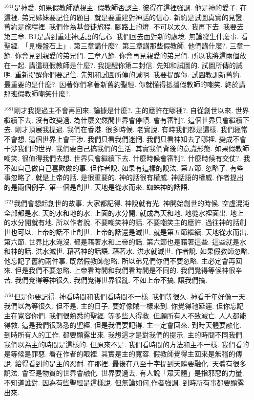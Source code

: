 \documentclass{book}
\begin{document}
$^{1641}$是神愛.
如果假教師藐視主.
假教師否認主.
彼得在這裡強調.
他是神的愛子.
在這裡.
弟兄姊妹要記住的題目.
就是要重建對神話的信心.
新約是試圖真實的見證.
舊約是旅程裡.
我們作為基督徒旅程.
腳路上的燈.
不可以太久.
我再下去.
我要去第三章.
B1是講到重建神話語的信心.
我們回去面對新的處境.
無論發生什麼事.
看聖經.
「見機盤石上」.
第三章講什麼?.
第三章講那些假教師.
他們講什麼?.
三章一節.
你會見到親愛的弟兄們.
三章八節.
你會再見親愛的弟兄們.
所以我將這兩個放在一起.
講這班假教師是什麼?.
我提醒你第二封信.
先知和試圖的.
試圖所傳的誡明.
重新提醒你們要記住.
先知和試圖所傳的誡明.
我要提醒你.
試圖教訓新舊約.
最重要的是什麼?.
因著你們拿著新舊約聖經.
你就懂得抵擋假教師的嘲笑.
終於講那班假教師嘲笑什麼?.

$^{1681}$剛才我提過主不會再回來.
論據是什麼?.
主的應許在哪裡?.
自從創世以來.
世界繼續下去.
沒有改變過.
為什麼突然間世界會停頓.
會有審判?.
這個世界只會繼續下去.
剛才頂展我提過.
我們在香港.
很多時候.
老實說.
有時我們都是這樣.
我們經常不會想.
這個世界上會干涉.
我們只看我們迷惘.
我們只看神知去了哪裡.
變成不會干涉我們的世界.
我們要自己搞我們的生活.
其實我們背後的意識形態.
如果假教師嘲笑.
很值得我們去想.
世界只會繼續下去.
什麼時候會審判?.
什麼時候有交仗?.
我不如自己做自己喜歡做的事.
但作者說.
如果有這樣的說法.
第五節.
忽略了.
有些事忽略了.
就是上帝的話.
是很重要的.
神的話很有權威.
神話語的權威.
作者提出的是兩個例子.
第一個是創世.
天地是從水而來.
蜘蛛神的話語.

$^{1721}$我們會想起創世的故事.
大家都記得.
神說就有光.
神開始創世的時候.
空虛混沌全部都是水.
天的水和地的水.
上面的水分開.
就成為天和地.
地從水裡面出.
地上的水分開就有地.
所以作者說.
不要嘲笑神的話.
不要嘲笑主的應許.
過往神的話創世也可以.
上帝的話不止創世.
上帝的話還是滅世.
就是第五節繼續.
天地從水而出.
第六節.
世界比水淹沒.
都是藉著水和上帝的話.
第六節也是藉著這些.
這些就是水和神的話.
洪水滅世.
藉著神的話語.
藉著水.
洪水就滅世.
作者說.
如果假教師忽略.
他忘記了舊約兩件事.
既然假教師忽略.
所以弟兄們你們不要忽略.
主必定會再回來.
但是我們不要忽略.
上帝看時間和我們看時間是不同的.
我們覺得等候神很辛苦.
我們覺得等神很久.
我們覺得世界很亂.
不如上帝不搞.
讓我們搞.

$^{1761}$但是你要記得.
神看時間和我們看時間不一樣.
我們等很久.
神看千年好像一天.
我們以為等很久.
但不是.
主的日子.
要好像賊一樣來到.
你覺得祂延遲.
但你忘記主在寬容你們.
我們很熟悉的聖經.
等多些人得救.
但願所有人不致滅亡.
人人都能得救.
這是我們很熟悉的聖經.
但是我們要記得.
主一定會回來.
到時天體要融化.
到時所有人的工作.
都要顯露出來.
我想這才是對我們的提示.
主的時間不同我們.
我們以為主的時間是這樣的.
但原來不是.
我們看時間的方法和主不一樣.
我們看的是等候是罪惡.
看在作者的眼裡.
其實是主的寬容.
假教師覺得主回來是無稽的傳說.
給得看到的是主的忍耐.
在那裡.
最後在八至十字提到天體要融化.
天體有很多說法.
會否是物質的世界會融化.
世界要過去.
有人說「眾天體」是指邪惡的力量.
不知道誰對.
因為有些聖經是這樣說.
但無論如何,作者強調.
到時所有事都要顯露出來.
\end{document}
